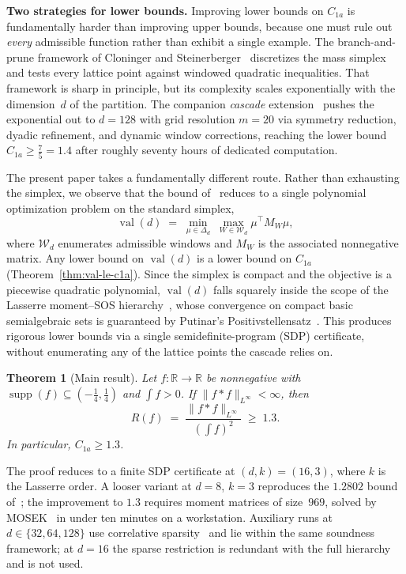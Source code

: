 \documentclass[11pt, letterpaper]{article}
\theoremstyle{paperplain}
\newtheorem{theorem}{Theorem}[section]
\theoremstyle{paperdef}
\newcommand{\R}{\mathbb{R}}
\newcommand{\supp}{\operatorname{supp}}
\newcommand{\val}{\operatorname{val}}
\begin{document}
\noindent\textbf{Two strategies for lower bounds.}  Improving lower
bounds on $C_{1a}$ is fundamentally harder than improving upper bounds,
because one must rule out \emph{every} admissible function rather than
exhibit a single example.  The branch-and-prune framework of Cloninger
and Steinerberger~\cite{CS17} discretizes the mass simplex and tests
every lattice point against windowed quadratic inequalities.  That
framework is sharp in principle, but its complexity scales
exponentially with the dimension~$d$ of the partition.  The companion
\emph{cascade} extension~\cite{BajajCS2026} pushes the exponential out
to $d=128$ with grid resolution $m=20$ via symmetry reduction, dyadic
refinement, and dynamic window corrections, reaching the lower bound
$C_{1a}\ge \tfrac75 = 1.4$ after roughly seventy hours of dedicated
computation.

The present paper takes a fundamentally different route.  Rather than
exhausting the simplex, we observe that the bound of~\cite{CS17}
reduces to a single polynomial optimization problem on the standard
simplex,
\[
  \val(d)
  \;=\;
  \min_{\mu \in \Delta_d}\;
  \max_{W \in \mathcal{W}_d}
  \mu^\top M_W \mu,
\]
where $\mathcal{W}_d$ enumerates admissible windows and $M_W$ is the
associated nonnegative matrix.  Any lower bound on $\val(d)$ is a lower
bound on $C_{1a}$ (Theorem~\ref{thm:val-le-c1a}).  Since the simplex is
compact and the objective is a piecewise quadratic polynomial, $\val(d)$
falls squarely inside the scope of the Lasserre moment--SOS
hierarchy~\cite{Lasserre2001,Lasserre2015,Parrilo03}, whose convergence
on compact basic semialgebraic sets is guaranteed by Putinar's
Positivstellensatz~\cite{Putinar1993}.  This produces rigorous lower
bounds via a single semidefinite-program (SDP) certificate, without
enumerating any of the lattice points the cascade relies on.

\begin{theorem}[Main result]
\label{thm:main}
Let $f : \R \to \R$ be nonnegative with
$\supp(f) \subseteq (-\tfrac14,\tfrac14)$ and $\int f > 0$.  If
$\|f*f\|_{L^\infty} < \infty$, then
\[
  R(f)
  \;=\;
  \frac{\|f*f\|_{L^\infty}}{\left(\int f\right)^2}
  \;\ge\;
  1.3.
\]
In particular, $C_{1a} \ge 1.3$.
\end{theorem}

The proof reduces to a finite SDP certificate at $(d,k)=(16,3)$, where
$k$ is the Lasserre order.  A looser variant at $d=8$, $k=3$
reproduces the $1.2802$ bound of~\cite{CS17}; the improvement to
$1.3$ requires moment matrices of size~$969$, solved by
MOSEK~\cite{MOSEK} in under ten minutes on a workstation.  Auxiliary
runs at $d\in\{32,64,128\}$ use correlative
sparsity~\cite{Waki2006} and lie within the same soundness
framework; at $d=16$ the sparse restriction is redundant with the
full hierarchy and is not used.
\end{document}
